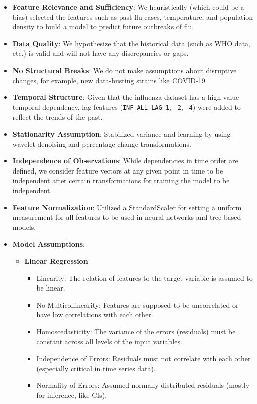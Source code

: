 \begin{itemize}
  \item \textbf{Feature Relevance and Sufficiency}: We heuristically (which could be a bias) selected the features such as past flu cases, temperature, and population density to build a model to predict future outbreaks of flu.
  \item \textbf{Data Quality}: We hypothesize that the historical data (such as WHO data, etc.) is valid and will not have any discrepancies or gaps.
  \item \textbf{No Structural Breaks}: We do not make assumptions about disruptive changes, for example, new data-busting strains like COVID-19.
  \item \textbf{Temporal Structure}: Given that the influenza dataset has a high value temporal dependency, lag features (\texttt{INF\_ALL\_LAG\_1}, \texttt{\_2}, \texttt{\_4}) were added to reflect the trends of the past.
  \item \textbf{Stationarity Assumption}: Stabilized variance and learning by using wavelet denoising and percentage change transformations.
  \item \textbf{Independence of Observations}: While dependencies in time order are defined, we consider feature vectors at any given point in time to be independent after certain transformations for training the model to be independent.
  \item \textbf{Feature Normalization}: Utilized a StandardScaler for setting a uniform measurement for all features to be used in neural networks and tree-based models.
  \item \textbf{Model Assumptions}:
  \begin{itemize}
    \item \textbf{Linear Regression}
    \begin{itemize}
      \item Linearity: The relation of features to the target variable is assumed to be linear.
      \item No Multicollinearity: Features are supposed to be uncorrelated or have low correlations with each other.
      \item Homoscedasticity: The variance of the errors (residuals) must be constant across all levels of the input variables.
      \item Independence of Errors: Residuals must not correlate with each other (especially critical in time series data).
      \item Normality of Errors: Assumed normally distributed residuals (mostly for inference, like CIs).

\end{itemize}
\end{itemize}
\end{itemize}
